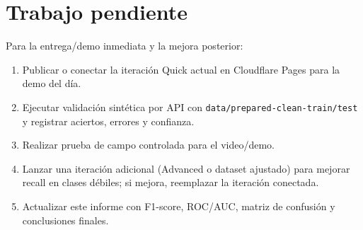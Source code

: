 \section{Trabajo pendiente}

Para la entrega/demo inmediata y la mejora posterior:

\begin{enumerate}
  \item Publicar o conectar la iteración Quick actual en Cloudflare Pages para la
        demo del día.
  \item Ejecutar validación sintética por API con \texttt{data/prepared-clean-train/test}
        y registrar aciertos, errores y confianza.
  \item Realizar prueba de campo controlada para el video/demo.
  \item Lanzar una iteración adicional (Advanced o dataset ajustado) para mejorar
        recall en clases débiles; si mejora, reemplazar la iteración conectada.
  \item Actualizar este informe con F1-score, ROC/AUC, matriz de confusión y
        conclusiones finales.
\end{enumerate}

